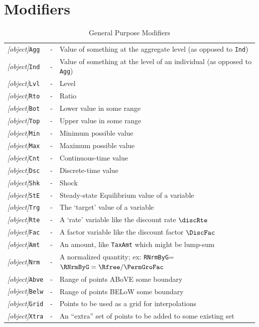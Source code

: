 \documentclass{econark}
\begin{document}
\section{Modifiers}
\begin{table}[ht]
  \centering
  \begin{tabular}{|>{\ttfamily}lcl|}
    \hline
    \textit{[object]}\texttt{Agg} & - & Value of something at the aggregate level (as opposed to \texttt{Ind})
    \\ \textit{[object]}\texttt{Ind} & - & Value of something at the level of an individual (as opposed to \texttt{Agg})
    \\ \textit{[object]}\texttt{Lvl} & - & Level
    \\ \textit{[object]}\texttt{Rto} & - & Ratio
    \\ \textit{[object]}\texttt{Bot} & - & Lower value in some range
    \\ \textit{[object]}\texttt{Top} & - & Upper value in some range
    \\ \textit{[object]}\texttt{Min} & - & Minimum possible value
    \\ \textit{[object]}\texttt{Max} & - & Maximum possible value
    \\ \textit{[object]}\texttt{Cnt} & - & Continuous-time value
    \\ \textit{[object]}\texttt{Dsc} & - & Discrete-time value
    \\ \textit{[object]}\texttt{Shk} & - & Shock
    \\ \textit{[object]}\texttt{StE} & - & Steady-state Equilibrium value of a variable
    \\ \textit{[object]}\texttt{Trg} & - & The `target' value of a variable
    \\ \textit{[object]}\texttt{Rte} & - & A `rate' variable like the discount rate $\discRte$
    \\ \textit{[object]}\texttt{Fac} & - & A factor variable like the discount factor $\DiscFac$
    \\ \textit{[object]}\texttt{Amt} & - & An amount, like \texttt{TaxAmt} which might be lump-sum
    \\ \textit{[object]}\texttt{Nrm} & - & A normalized quantity; ex: \texttt{RNrmByG}=$\RNrmByG=\Rfree/\PermGroFac$
    \\ \textit{[object]}\texttt{Abve} & - & Range of points ABoVE some boundary
    \\ \textit{[object]}\texttt{Belw} & - & Range of points BELoW some boundary
    \\ \textit{[object]}\texttt{Grid} & - & Points to be used as a grid for interpolations
    \\ \textit{[object]}\texttt{Xtra} & - & An ``extra'' set of points to be added to some existing set \\ \hline
  \end{tabular}
  \caption{General Purpose Modifiers}
  \label{table:General}
\end{table}
\end{document}
